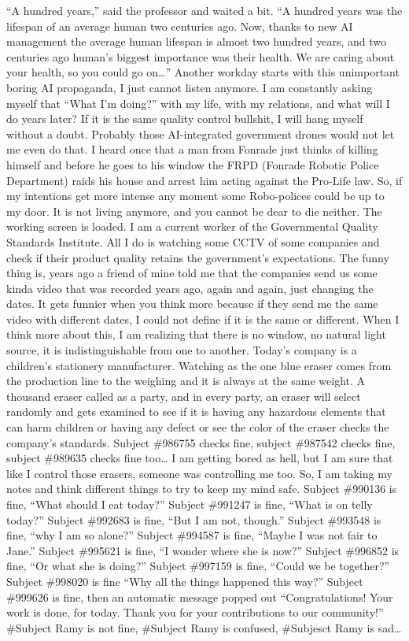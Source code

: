 \documentclass[]{book}
\begin{document}
``A hundred years,'' said the professor and waited a bit. ``A hundred years was the lifespan of an average human two centuries ago. Now, thanks to new AI management the average human lifespan is almost two hundred years, and two centuries ago human's biggest importance was their health. We are caring about your health, so you could go on\ldots{}'' Another workday starts with this unimportant boring AI propaganda, I just cannot listen anymore. I am constantly asking myself that ``What I'm doing?'' with my life, with my relations, and what will I do years later? If it is the same quality control bullshit, I will hang myself without a doubt. Probably those AI-integrated government drones would not let me even do that. I heard once that a man from Fonrade just thinks of killing himself and before he goes to his window the FRPD (Fonrade Robotic Police Department) raids his house and arrest him acting against the Pro-Life law. So, if my intentions get more intense any moment some Robo-polices could be up to my door. It is not living anymore, and you cannot be dear to die neither. The working screen is loaded. I am a current worker of the Governmental Quality Standards Institute. All I do is watching some CCTV of some companies and check if their product quality retains the government's expectations. The funny thing is, years ago a friend of mine told me that the companies send us some kinda video that was recorded years ago, again and again, just changing the dates. It gets funnier when you think more because if they send me the same video with different dates, I could not define if it is the same or different. When I think more about this, I am realizing that there is no window, no natural light source, it is indistinguishable from one to another. Today's company is a children's stationery manufacturer. Watching as the one blue eraser comes from the production line to the weighing and it is always at the same weight. A thousand eraser called as a party, and in every party, an eraser will select randomly and gets examined to see if it is having any hazardous elements that can harm children or having any defect or see the color of the eraser checks the company's standards. Subject \#986755 checks fine, subject \#987542 checks fine, subject \#989635 checks fine too\ldots{} I am getting bored as hell, but I am sure that like I control those erasers, someone was controlling me too. So, I am taking my notes and think different things to try to keep my mind safe. Subject \#990136 is fine, ``What should I eat today?'' Subject \#991247 is fine, ``What is on telly today?'' Subject \#992683 is fine, ``But I am not, though.'' Subject \#993548 is fine, ``why I am so alone?'' Subject \#994587 is fine, ``Maybe I was not fair to Jane.'' Subject \#995621 is fine, ``I wonder where she is now?'' Subject \#996852 is fine, ``Or what she is doing?'' Subject \#997159 is fine, ``Could we be together?'' Subject \#998020 is fine ``Why all the things happened this way?'' Subject \#999626 is fine, then an automatic message popped out ``Congratulations! Your work is done, for today. Thank you for your contributions to our community!'' \#Subject Ramy is not fine, \#Subject Ramy is confused, \#Subjesct Ramy is sad\ldots{}
\end{document}
